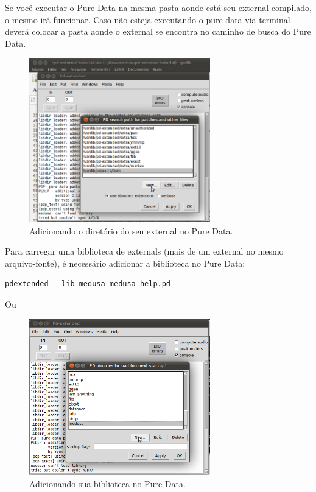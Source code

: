 \documentclass[10pt,a4paper]{report}
\begin{document}
Se você executar o Pure Data na mesma pasta aonde está seu external compilado, o mesmo irá funcionar. Caso não esteja executando o pure data via terminal deverá colocar a pasta aonde o external se encontra no caminho de busca do Pure Data.
\begin{figure}[h!]
	\centering
	\includegraphics[width=0.7\textwidth]{path}
	\caption{Adicionando o diretório do seu external no Pure Data.}
\end{figure}

Para carregar uma biblioteca de externals (mais de um external no mesmo arquivo-fonte), é necessário adicionar a biblioteca no Pure Data:

 
\begin{lstlisting}
pdextended  -lib medusa medusa-help.pd 
\end{lstlisting}

Ou 

\begin{figure}[h!]
	\centering
	\includegraphics[width=0.7\textwidth]{startup}
	\caption{Adicionando sua biblioteca no Pure Data.}
\end{figure}
\end{document}
